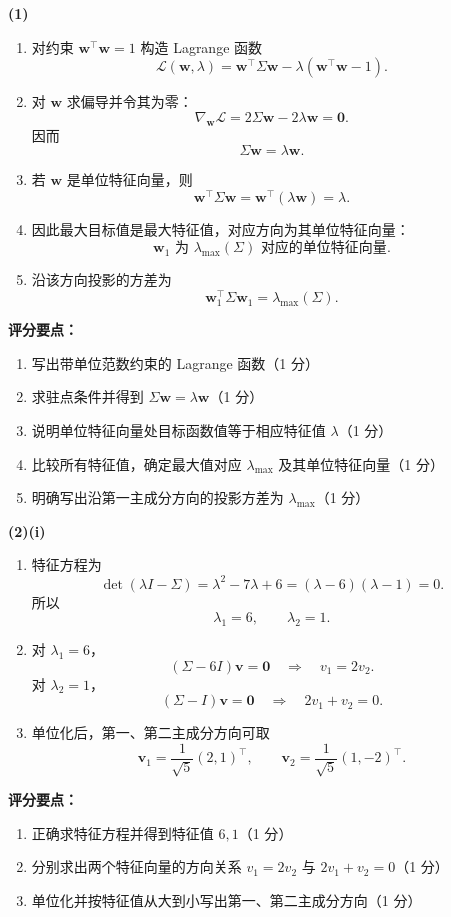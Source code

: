\documentclass[10pt,a4paper]{exam-zh}
\newcommand{\bvec}[1]{\boldsymbol{#1}}
\newenvironment{grading}
  {\par\smallskip\Needspace{5\baselineskip}\small
   \noindent\textcolor{gradingred}{\textbf{评分要点：}}
   \begin{enumerate}[label=\textcolor{gradingred}{\arabic*.},
     leftmargin=2.4em,itemsep=0pt,topsep=2pt,parsep=0pt]}
  {\end{enumerate}\smallskip}
\newcommand{\gradeitem}[2]{\item #1（\textcolor{gradingred}{#2 分}）}
\newenvironment{answersteps}
  {\begin{enumerate}[label=\textbf{步骤 \arabic*.},
    leftmargin=4.8em,labelsep=0.6em,itemsep=2pt,topsep=3pt,parsep=0pt]}
  {\end{enumerate}}
\newcommand{\subanswer}[1]{%
  \par\medskip\Needspace{6\baselineskip}\noindent\textbf{#1}\par}
\begin{document}
\begin{solution}
\subanswer{(1)}
\begin{answersteps}
  \item 对约束 $\bvec w^\top\bvec w=1$ 构造 Lagrange 函数
  \[
  \mathcal L(\bvec w,\lambda)
  =\bvec w^\top\Sigma\bvec w
  -\lambda(\bvec w^\top\bvec w-1).
  \]
  \item 对 $\bvec w$ 求偏导并令其为零：
  \[
  \nabla_{\bvec w}\mathcal L
  =2\Sigma\bvec w-2\lambda\bvec w=\bvec0.
  \]
  因而
  \[
  \Sigma\bvec w=\lambda\bvec w.
  \]
  \item 若 $\bvec w$ 是单位特征向量，则
  \[
  \bvec w^\top\Sigma\bvec w
  =\bvec w^\top(\lambda\bvec w)
  =\lambda.
  \]
  \item 因此最大目标值是最大特征值，对应方向为其单位特征向量：
  \[
  \boxed{\bvec w_1\text{ 为 }\lambda_{\max}(\Sigma)\text{ 对应的单位特征向量}}.
  \]
  \item 沿该方向投影的方差为
  \[
  \boxed{\bvec w_1^\top\Sigma\bvec w_1=\lambda_{\max}(\Sigma)}.
  \]
\end{answersteps}
\begin{grading}
  \gradeitem{写出带单位范数约束的 Lagrange 函数}{1}
  \gradeitem{求驻点条件并得到 $\Sigma\bvec w=\lambda\bvec w$}{1}
  \gradeitem{说明单位特征向量处目标函数值等于相应特征值 $\lambda$}{1}
  \gradeitem{比较所有特征值，确定最大值对应 $\lambda_{\max}$ 及其单位特征向量}{1}
  \gradeitem{明确写出沿第一主成分方向的投影方差为 $\lambda_{\max}$}{1}
\end{grading}

\subanswer{(2)(i)}
\begin{answersteps}
  \item 特征方程为
  \[
  \det(\lambda I-\Sigma)
  =\lambda^2-7\lambda+6
  =(\lambda-6)(\lambda-1)=0.
  \]
  所以
  \[
  \lambda_1=6,\qquad \lambda_2=1.
  \]
  \item 对 $\lambda_1=6$，
  \[
  (\Sigma-6I)\bvec v=\bvec0
  \quad\Longrightarrow\quad
  v_1=2v_2.
  \]
  对 $\lambda_2=1$，
  \[
  (\Sigma-I)\bvec v=\bvec0
  \quad\Longrightarrow\quad
  2v_1+v_2=0.
  \]
  \item 单位化后，第一、第二主成分方向可取
  \[
  \boxed{
  \bvec v_1=\frac1{\sqrt5}(2,1)^\top,
  \qquad
  \bvec v_2=\frac1{\sqrt5}(1,-2)^\top}.
  \]
\end{answersteps}
\begin{grading}
  \gradeitem{正确求特征方程并得到特征值 $6,1$}{1}
  \gradeitem{分别求出两个特征向量的方向关系
  $v_1=2v_2$ 与 $2v_1+v_2=0$}{1}
  \gradeitem{单位化并按特征值从大到小写出第一、第二主成分方向}{1}
\end{grading}


\end{solution}
\end{document}
